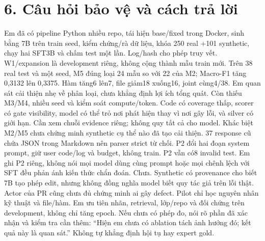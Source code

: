 \documentclass[12pt,a4paper]{article}
\begin{document}
\section*{6. Câu hỏi bảo vệ và cách trả lời}
Em đã có pipeline Python nhiều repo, tái hiện base/fixed trong Docker, sinh bằng 7B trên train seed, kiểm chứng/rà dữ liệu, khóa 250 real +101 synthetic, chạy hai SFT3B và chấm test một lần. Log/hash cho phép truy vết. W1/expansion là development riêng, không cộng thành mẫu train mới.
Trên 38 real test và một seed, M5 đúng loại 24 mẫu so với 22 của M2; Macro-F1 tăng 0,3132 lên 0,3375. Hàm tăng6 lên7, file giảm18 xuống16, joint cùng4/38. Em quan sát cải thiện nhẹ về phân loại, chưa khẳng định lợi ích tổng quát. Còn thiếu M3/M4, nhiều seed và kiểm soát compute/token.
Code có coverage thấp, scorer có gate visibility, model có thể trỏ nơi phát hiện thay vì nơi gây lỗi, và silver có giới hạn. Cần xem chuỗi evidence riêng; không quy tất cả cho model. Khác biệt M2/M5 chưa chứng minh synthetic cụ thể nào đã tạo cải thiện.
37 response cũ chứa JSON trong Markdown nên parser strict từ chối. P2 đổi hai đoạn system prompt, giữ user code/log và budget, không train. P2 vẫn có8 invalid test. Em ghi P2 riêng, không nói mọi model dùng cùng prompt hoặc mọi chênh lệch với SFT đều phản ánh kiến thức chẩn đoán.
Chưa. Synthetic có provenance cho biết 7B tạo phép edit, nhưng không đồng nghĩa model biết quy tác giả trên lỗi thật. Actor của PR cũng chưa đủ chứng minh ai gây defect. Pilot chỉ học nguyên nhân kỹ thuật và file/hàm.
Em ưu tiên nhãn, retrieval, lớp/repo và đối chứng trên development, không chỉ tăng epoch. Nếu chưa có phép đo, nói rõ phần đã xác nhận và kiểm tra cần thêm: ``Hiện em chưa có ablation tách ảnh hưởng đó; kết quả này là quan sát.'' Không tự khẳng định hội tụ hay expert gold.
\end{document}
